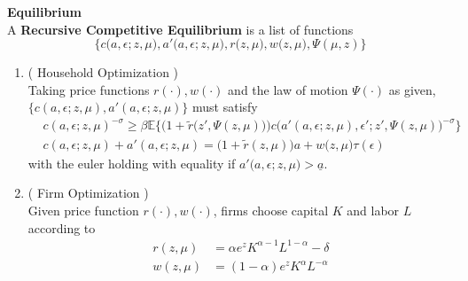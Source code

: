 \documentclass[a4paper,10pt]{article}  %
\begin{document}
\textbf{Equilibrium} \\
A \textbf{Recursive Competitive Equilibrium} is a list of functions 
\[
   \Big\{
   c\big( a,\epsilon ; z, \mu \big) ,a'\big( a,\epsilon ; z, \mu \big),
   r\big( z,\mu \big), w\big( z,\mu \big),
   \Psi (\mu,z)
   \Big\} 
\]
\begin{enumerate}
   \item ( Household Optimization ) \\
         Taking price functions $ r(\cdot), w( \cdot ) $ and the law of motion $\Psi(\cdot)$ as given,
         $ \Big\{ c( a,\epsilon; z, \mu ) , a'( a,\epsilon ; z, \mu ) \Big\}$ must satisfy
         \begin{align}
              & c( a, \epsilon ; z,\mu )^{ - \sigma } \ge
            \beta \mathbb{E} \bigg\{
            \Big( 1+ \tilde{r} \Big( z', \Psi( z, \mu ) \Big) \Big) c\Big( a'( a, \epsilon; z, \mu ),
            \epsilon'; z', \Psi( z,\mu ) \Big)^{- \sigma}
            \bigg\} \label{eq:euler} \\
              & c( a, \epsilon ; z,\mu ) + a'( a,\epsilon; z, \mu ) = \big( 1 + \tilde{r}(z, \mu ) \big)
            a + w \big( z, \mu \big) \tau( \epsilon )  \label{eq:budget_constraint}
         \end{align}
         with the euler holding with equality if $ a'\big( a, \epsilon; z , \mu \big) > \underline{a} $.

   \item ( Firm Optimization ) \\
         Given price function $ r( \cdot ) , w ( \cdot ) $, firms choose capital $K$ and labor $L$ according to
         \begin{align}
            r( z, \mu ) & = \alpha e^{z} K^{ \alpha-1 } L^{ 1- \alpha } - \delta \\
            w( z, \mu ) & = ( 1- \alpha ) e^{z} K^{ \alpha } L^{ - \alpha }
         \end{align}


\end{enumerate}
\end{document}
